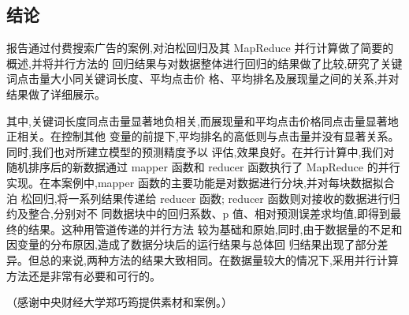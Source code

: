 \subsection{结论}\label{ux7ed3ux8bba}

报告通过付费搜索广告的案例,对泊松回归及其 MapReduce
并行计算做了简要的概述,并将并行方法的
回归结果与对数据整体进行回归的结果做了比较,研究了关键词点击量大小同关键词长度、平均点击价
格、平均排名及展现量之间的关系,并对结果做了详细展示。

其中,关键词长度同点击量显著地负相关,而展现量和平均点击价格同点击量显著地正相关。在控制其他
变量的前提下,平均排名的高低则与点击量并没有显著关系。同时,我们也对所建立模型的预测精度予以
评估,效果良好。在并行计算中,我们对随机排序后的新数据通过 mapper 函数和
reducer 函数执行了 MapReduce 的并行实现。在本案例中,mapper
函数的主要功能是对数据进行分块,并对每块数据拟合泊
松回归,将一系列结果传递给 reducer 函数; reducer
函数则对接收的数据进行归约及整合,分别对不 同数据块中的回归系数、p
值、相对预测误差求均值,即得到最终的结果。这种用管道传递的并行方法
较为基础和原始,同时,由于数据量的不足和因变量的分布原因,造成了数据分块后的运行结果与总体回
归结果出现了部分差异。但总的来说,两种方法的结果大致相同。在数据量较大的情况下,采用并行计算
方法还是非常有必要和可行的。

（感谢中央财经大学郑巧筠提供素材和案例。）
